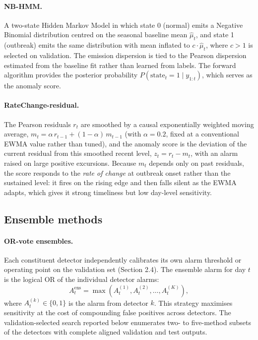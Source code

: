 \documentclass[11pt]{article}
\begin{document}
\paragraph{NB-HMM.} A two-state Hidden Markov Model in which state 0 (normal) emits a Negative Binomial distribution centred on the seasonal baseline mean $\hat{\mu}_t$, and state 1 (outbreak) emits the same distribution with mean inflated to $c \cdot \hat{\mu}_t$, where $c > 1$ is selected on validation. The emission dispersion is tied to the Pearson dispersion estimated from the baseline fit rather than learned from labels. The forward algorithm provides the posterior probability $P(\text{state}_t = 1 \mid y_{1:t})$, which serves as the anomaly score.

\paragraph{RateChange-residual.} The Pearson residuals $r_t$ are smoothed by a causal exponentially weighted moving average, $m_t = \alpha\,r_{t-1} + (1-\alpha)\,m_{t-1}$ (with $\alpha = 0.2$, fixed at a conventional EWMA value rather than tuned), and the anomaly score is the deviation of the current residual from this smoothed recent level, $z_t = r_t - m_t$, with an alarm raised on large positive excursions. Because $m_t$ depends only on past residuals, the score responds to the \textit{rate of change} at outbreak onset rather than the sustained level: it fires on the rising edge and then falls silent as the EWMA adapts, which gives it strong timeliness but low day-level sensitivity.

\subsection{Ensemble methods}

\paragraph{OR-vote ensembles.} Each constituent detector independently calibrates its own alarm threshold or operating point on the validation set (Section 2.4). The ensemble alarm for day $t$ is the logical OR of the individual detector alarms:
\[
A_t^{\text{ens}} = \max(A_t^{(1)}, A_t^{(2)}, \ldots, A_t^{(K)}),
\]
where $A_t^{(k)} \in \{0, 1\}$ is the alarm from detector $k$. This strategy maximises sensitivity at the cost of compounding false positives across detectors. The validation-selected search reported below enumerates two- to five-method subsets of the detectors with complete aligned validation and test outputs.
\end{document}
